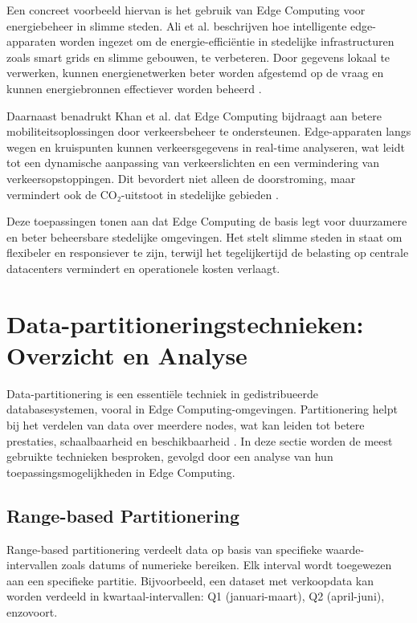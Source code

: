 Een concreet voorbeeld hiervan is het gebruik van Edge Computing voor energiebeheer in slimme steden. Ali et al. beschrijven hoe intelligente edge-apparaten worden ingezet om de energie-efficiëntie in stedelijke infrastructuren zoals smart grids en slimme gebouwen, te verbeteren. Door gegevens lokaal te verwerken, kunnen energienetwerken beter worden afgestemd op de vraag en kunnen energiebronnen effectiever worden beheerd \autocite{EnergyManagement2023}.
 
Daarnaast benadrukt Khan et al. dat Edge Computing bijdraagt aan betere mobiliteitsoplossingen door verkeersbeheer te ondersteunen. Edge-apparaten langs wegen en kruispunten kunnen verkeersgegevens in real-time analyseren, wat leidt tot een dynamische aanpassing van verkeerslichten en een vermindering van verkeersopstoppingen. Dit bevordert niet alleen de doorstroming, maar vermindert ook de CO₂-uitstoot in stedelijke gebieden \autocite{EdgeSmartCities2023}.
 
Deze toepassingen tonen aan dat Edge Computing de basis legt voor duurzamere en beter beheersbare stedelijke omgevingen. Het stelt slimme steden in staat om flexibeler en responsiever te zijn, terwijl het tegelijkertijd de belasting op centrale datacenters vermindert en operationele kosten verlaagt.

\section{Data-partitioneringstechnieken: Overzicht en Analyse}

Data-partitionering is een essentiële techniek in gedistribueerde databasesystemen, vooral in Edge Computing-omgevingen. Partitionering helpt bij het verdelen van data over meerdere nodes, wat kan leiden tot betere prestaties, schaalbaarheid en beschikbaarheid \autocite{Karger1997}.
In deze sectie worden de meest gebruikte technieken besproken, gevolgd door een analyse van hun toepassingsmogelijkheden in Edge Computing.

\subsection{Range-based Partitionering}
Range-based partitionering verdeelt data op basis van specifieke waarde-intervallen zoals datums of numerieke bereiken. Elk interval wordt toegewezen aan een specifieke partitie. Bijvoorbeeld, een dataset met verkoopdata kan worden verdeeld in kwartaal-intervallen: Q1 (januari-maart), Q2 (april-juni), enzovoort.

